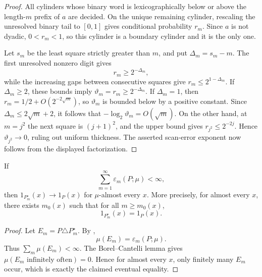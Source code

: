 \begin{proof}
All cylinders whose binary word is lexicographically below or above the
length-\(m\) prefix of \(a\) are decided.  On the unique remaining cylinder,
rescaling the unresolved binary tail to \([0,1]\) gives conditional
probability \(r_m\).  Since \(a\) is not dyadic, \(0<r_m<1\), so this
cylinder is a boundary cylinder and it is the only one.

Let \(s_m\) be the least square strictly greater than \(m\), and put
\(\Delta_m=s_m-m\).  The first unresolved nonzero digit gives
\[
r_m\ge 2^{-\Delta_m},
\]
while the increasing gaps between consecutive squares give
\(r_m\le 2^{1-\Delta_m}\).  If \(\Delta_m\ge2\), these bounds imply
\(\vartheta_m=r_m\ge2^{-\Delta_m}\).  If \(\Delta_m=1\), then
\(r_m=1/2+O(2^{-2\sqrt m})\), so \(\vartheta_m\) is bounded below by a
positive constant.  Since \(\Delta_m\le2\sqrt m+2\), it follows that
\(-\log_2\vartheta_m=O(\sqrt m)\).  On the other hand, at \(m=j^2\) the next
square is \((j+1)^2\), and the upper bound gives
\(r_{j^2}\le2^{-2j}\).  Hence \(\vartheta_{j^2}\to0\), ruling out uniform
thickness.  The asserted scan-error exponent now follows from the displayed
factorization.
\end{proof}

\begin{theorem}
\label{thm:eventual-clarity}
If
\[
\sum_{m=1}^{\infty}\varepsilon_m(P;\mu)<\infty,
\]
then \(1_{P_m^\star}(x)\to 1_P(x)\) for \(\mu\)-almost every \(x\).  More precisely, for almost every \(x\), there exists \(m_0(x)\) such that for all \(m\ge m_0(x)\),
\[
1_{P_m^\star}(x)=1_P(x).
\]
\end{theorem}

\begin{proof}
Let \(E_m=P\triangle P_m^\star\).  By ,
\[
\mu(E_m)=\varepsilon_m(P;\mu).
\]
Thus \(\sum_m\mu(E_m)<\infty\).  The Borel--Cantelli lemma gives \(\mu(E_m\text{ infinitely often})=0\).  Hence for almost every \(x\), only finitely many \(E_m\) occur, which is exactly the claimed eventual equality.
\end{proof}
